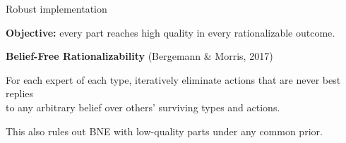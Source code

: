 \documentclass[10pt,aspectratio=169, compressed]{beamer}
\begin{document}
\begin{frame}[label=solutionconcept]{Robust implementation}

\textbf{Objective:} every part reaches high quality in every rationalizable outcome.

\medskip


\bigskip

\textbf{Belief-Free Rationalizability} (Bergemann \& Morris, 2017)
\hfill\hyperlink{BFRdef}{}


For each expert of each type, iteratively eliminate actions that are never best replies \\
    to any arbitrary belief over others' surviving types and actions.


\medskip

{\small This also rules out BNE with low-quality parts under any common prior.}

\end{frame}



\begin{frame}{\ }
\begin{center}
\setlength{\tabcolsep}{8pt}
\renewcommand{\arraystretch}{1.2}
\end{center}
\end{frame}
\end{document}
